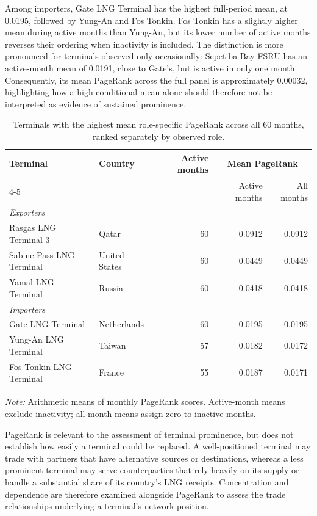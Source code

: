 \documentclass[pdftex,12pt,openright,a4paper,oneside]{book}
\begin{document}
Among importers, Gate LNG Terminal has the highest full-period mean, at 0.0195, followed by Yung-An and Fos Tonkin. 
Fos Tonkin has a slightly higher mean during active months than Yung-An, but its lower number of active months reverses their ordering when inactivity is included. 
The distinction is more pronounced for terminals observed only occasionally: Sepetiba Bay FSRU has an active-month mean of 0.0191, close to Gate's, but is active in only one month. 
Consequently, its mean PageRank across the full panel is approximately 0.00032, highlighting how a high conditional mean alone should therefore not be interpreted as evidence of sustained prominence.

\begin{table}[htbp]
\centering
\small
\setlength{\tabcolsep}{3pt}
\caption{Terminals with the highest mean role-specific PageRank across all 60 months, ranked separately by observed role.}
\label{tab:terminal_pagerank_period}
\begin{tabular}{llrrr}
\toprule
Terminal & Country & Active months & \multicolumn{2}{c}{Mean PageRank} \tabularnewline
\cmidrule(lr){4-5}
 & & & Active months & All months \tabularnewline
\midrule
\multicolumn{5}{l}{\textit{Exporters}} \tabularnewline
Rasgas LNG Terminal 3 & Qatar & 60 & 0.0912 & 0.0912 \tabularnewline
Sabine Pass LNG Terminal & United States & 60 & 0.0449 & 0.0449 \tabularnewline
Yamal LNG Terminal & Russia & 60 & 0.0418 & 0.0418 \tabularnewline
\midrule
\multicolumn{5}{l}{\textit{Importers}} \tabularnewline
Gate LNG Terminal & Netherlands & 60 & 0.0195 & 0.0195 \tabularnewline
Yung-An LNG Terminal & Taiwan & 57 & 0.0182 & 0.0172 \tabularnewline
Fos Tonkin LNG Terminal & France & 55 & 0.0187 & 0.0171 \tabularnewline
\bottomrule
\end{tabular}

\medskip
\begin{minipage}{0.95\textwidth}
\footnotesize
\textit{Note:} Arithmetic means of monthly PageRank scores. Active-month means exclude inactivity; all-month means assign zero to inactive months. 
\end{minipage}
\end{table}

PageRank is relevant to the assessment of terminal prominence, but does not establish how easily a terminal could be replaced. A well-positioned terminal may trade with partners that have alternative sources or destinations, whereas a less prominent terminal may serve counterparties that rely heavily on its supply or handle a substantial share of its country's LNG receipts. Concentration and dependence are therefore examined alongside PageRank to assess the trade relationships underlying a terminal's network position.
\end{document}
